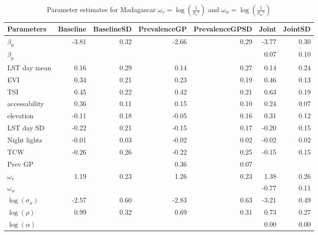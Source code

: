 \documentclass[10pt,a4]{article}
\begin{document}
\begin{table}[ht]
\centering
\begin{tabular}{lrrrrrr}
  \hline
Parameters & Baseline & BaselineSD & PrevalenceGP & PrevalenceGPSD & Joint & JointSD \\ 
  \hline
$\beta_0$ & -3.81 & 0.32 & -2.66 & 0.29 & -3.77 & 0.30 \\ 
  $\beta_p$ &  &  &  &  & 0.07 & 0.10 \\ 
  LST day mean & 0.16 & 0.29 & 0.14 & 0.27 & 0.14 & 0.24 \\ 
  EVI & 0.34 & 0.21 & 0.23 & 0.19 & 0.46 & 0.13 \\ 
  TSI & 0.45 & 0.22 & 0.42 & 0.21 & 0.63 & 0.19 \\ 
  accessability & 0.36 & 0.11 & 0.15 & 0.10 & 0.24 & 0.07 \\ 
  elevation & -0.11 & 0.18 & -0.05 & 0.16 & 0.31 & 0.12 \\ 
  LST day SD & -0.22 & 0.21 & -0.15 & 0.17 & -0.20 & 0.15 \\ 
  Night lights & -0.01 & 0.03 & -0.02 & 0.02 & -0.02 & 0.02 \\ 
  TCW & -0.26 & 0.26 & -0.22 & 0.25 & -0.15 & 0.15 \\ 
  Prev GP &  &  & 0.36 & 0.07 &  &  \\ 
  $\omega_v$ & 1.19 & 0.23 & 1.26 & 0.23 & 1.38 & 0.26 \\ 
  $\omega_w$ &  &  &  &  & -0.77 & 0.11 \\ 
  $\log(\sigma_u)$ & -2.57 & 0.60 & -2.83 & 0.63 & -3.21 & 0.49 \\ 
  $\log(\rho)$ & 0.99 & 0.32 & 0.69 & 0.31 & 0.73 & 0.27 \\ 
  $\log(\alpha)$ &  &  &  &  & 0.00 & 0.00 \\ 
   \hline
\end{tabular}
\label{parsmdg}
\caption{Parameter estimates for Madagascar $\omega_v = \log\left(\frac{1}{{\sigma_v}^2}\right)$ and $\omega_w = \log\left(\frac{1}{{\sigma_w}^2}\right)$} 
\end{table}
\end{document}
